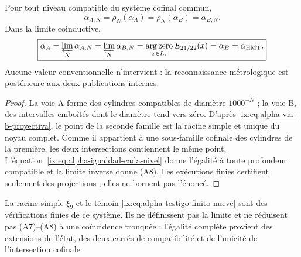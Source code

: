 \begin{theorem}
\label{ix:prop:alpha-dos-limites-historico-rev04}
Pour tout niveau compatible du système cofinal commun,
\begingroup
\renewcommand{\theequation}{A7}
\begin{equation}
 \boxed{\alpha_{A,N}=\rho_N(\alpha_A)
 =\rho_N(\alpha_B)=\alpha_{B,N}.}
 \label{ix:eq:alpha-dos-vias-cada-nivel-historico-rev04}
\end{equation}
\endgroup
Dans la limite coinductive,
\begingroup
\renewcommand{\theequation}{A8}
\begin{equation}
 \boxed{\alpha_A
 =\varprojlim_N\alpha_{A,N}
 =\varprojlim_N\alpha_{B,N}
 =\operatorname*{arg\,zero}_{x\in I_\alpha}E_{21/22}(x)
 =\alpha_B=\alpha_{\mathrm{HMT}}.}
 \label{ix:eq:alpha-dos-vias-limite-coinductivo-historico-rev04}
\end{equation}
\endgroup
Aucune valeur conventionnelle n'intervient : la reconnaissance métrologique est postérieure aux deux publications internes.
\end{theorem}

\begin{proof}
La voie A forme des cylindres compatibles de diamètre \(1000^{-N}\) ; la voie B,
des intervalles emboîtés dont le diamètre tend vers zéro. D'après
\eqref{ix:eq:alpha-via-b-proyectiva}, le point de la seconde famille est la racine
simple et unique du noyau complet. Comme il appartient à une sous-famille cofinale
des cylindres de la première, les deux intersections contiennent le même point.
L'équation~\eqref{ix:eq:alpha-igualdad-cada-nivel} donne l'égalité à toute
profondeur compatible et la limite inverse donne (A8). Les exécutions finies
certifient seulement des projections ; elles ne bornent pas l'énoncé.
\end{proof}

La racine simple \(\xi_9\) et le témoin \eqref{ix:eq:alpha-testigo-finito-nueve} sont des vérifications finies de ce système. Ils ne définissent pas la limite et ne réduisent pas (A7)--(A8) à une coïncidence tronquée : l'égalité complète provient des extensions de l'état, des deux carrés de compatibilité et de l'unicité de l'intersection cofinale.
